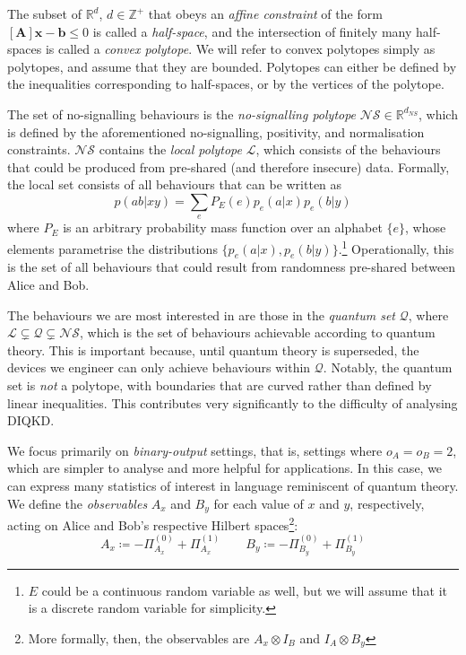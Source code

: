 \documentclass[10pt, a4paper]{article}
\numberwithin{equation}{section} %
\theoremstyle{definition}
\theoremstyle{plain}
\newcommand{\?}{\mathrel{?}} %
\newcommand{\Z}{\mathbb{Z}} %
\newcommand{\R}{\mathbb{R}} %
\newcommand{\cvec}[1]{\boldsymbol{\mathbf{#1}}}    %
\newcommand{\matr}[1]{\left[\mathbf{#1}\right]} %
\newcommand{\Ls}{\mathcal{L}}
\newcommand{\Qs}{\mathcal{Q}}
\newcommand{\NSs}{\mathcal{NS}}
\begin{document}
  The subset of \(\R^d\), \(d \in \Z^+\) that obeys an \emph{affine constraint} of the form \(\matr{A}\cvec{x} - \cvec{b} \leq 0\) is called a \emph{half-space}, and the intersection of finitely many half-spaces is called a \emph{convex polytope}. We will refer to convex polytopes simply as polytopes, and assume that they are bounded. Polytopes can either be defined by the inequalities corresponding to half-spaces, or by the vertices of the polytope.

  The set of no-signalling behaviours is the \emph{no-signalling polytope} \(\NSs \in \R^{d_{NS}}\), which is defined by the aforementioned no-signalling, positivity, and normalisation constraints. \(\NSs\) contains the \emph{local polytope} \(\Ls\), which consists of the behaviours that could be produced from pre-shared (and therefore insecure) data. Formally, the local set consists of all behaviours that can be written as 
  \begin{equation}\label{eqn:localdef}
    p(ab|xy) = \sum_e P_E(e) p_{e}(a|x)p_{e}(b|y)
  \end{equation}
  where \(P_E\) is an arbitrary probability mass function over an alphabet \(\{e\}\), whose elements parametrise the distributions \(\{p_e(a|x), p_e(b|y)\}\).\footnote{\(E\) could be a continuous random variable as well, but we will assume that it is a discrete random variable for simplicity.} Operationally, this is the set of all behaviours that could result from randomness pre-shared between Alice and Bob.

  The behaviours we are most interested in are those in the \emph{quantum set} \(\Qs\), where \(\Ls \subsetneq \Qs \subsetneq \NSs\), which is the set of behaviours achievable according to quantum theory. This is important because, until quantum theory is superseded, the devices we engineer can only achieve behaviours within \(\Qs\). Notably, the quantum set is \emph{not} a polytope, with boundaries that are curved rather than defined by linear inequalities. This contributes very significantly to the difficulty of analysing DIQKD.\@

  We focus primarily on \emph{binary-output} settings, that is, settings where \(o_A = o_B = 2\), which are simpler to analyse and more helpful for applications. In this case, we can express many statistics of interest in language reminiscent of quantum theory. We define the \emph{observables} \(A_x\) and \(B_y\) for each value of \(x\) and \(y\), respectively, acting on Alice and Bob's respective Hilbert spaces\footnote{More formally, then, the observables are \(A_x \otimes I_B\) and \(I_A \otimes B_y\)}:
  \[ A_x \coloneqq -\Pi_{A_x}^{(0)} + \Pi_{A_x}^{(1)} \qquad B_y \coloneqq -\Pi_{B_y}^{(0)} + \Pi_{B_y}^{(1)} \]
\end{document}
